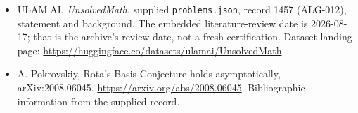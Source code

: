 \documentclass[11pt,a4paper]{article}
\begin{document}
{\small

\begin{itemize}

\item[\hypertarget{source:1457:1}{S1}] ULAM.AI, \emph{UnsolvedMath}, supplied \texttt{problems.json}, record 1457 (ALG-012), statement and background. The embedded literature-review date is 2026-08-17; that is the archive’s review date, not a fresh certification. Dataset landing page: \url{https://huggingface.co/datasets/ulamai/UnsolvedMath}.

\item[\hypertarget{source:1457:2}{S2}] A. Pokrovskiy, Rota's Basis Conjecture holds asymptotically, arXiv:2008.06045. \url{https://arxiv.org/abs/2008.06045}. Bibliographic information from the supplied record.

\end{itemize}

}

\label{end:1457}
\end{document}
